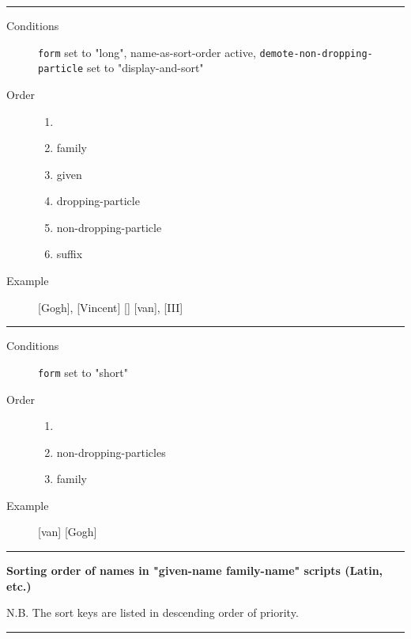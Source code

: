 \begin{center}\rule{0.5\linewidth}{0.5pt}\end{center}

\begin{description}
\item[Conditions]
\texttt{form} set to "long", name-as-sort-order active,
\texttt{demote-non-dropping-particle} set to "display-and-sort"
\item[Order]
\begin{enumerate}
\def\labelenumi{\arabic{enumi})}
\tightlist
\item[]
\item
  family
\item
  given
\item
  dropping-particle
\item
  non-dropping-particle
\item
  suffix
\end{enumerate}
\item[Example]
{[}Gogh{]}, {[}Vincent{]} {[}{]} {[}van{]}, {[}III{]}
\end{description}

\begin{center}\rule{0.5\linewidth}{0.5pt}\end{center}

\begin{description}
\item[Conditions]
\texttt{form} set to "short"
\item[Order]
\begin{enumerate}
\def\labelenumi{\arabic{enumi})}
\tightlist
\item[]
\item
  non-dropping-particles
\item
  family
\end{enumerate}
\item[Example]
{[}van{]} {[}Gogh{]}
\end{description}

\begin{center}\rule{0.5\linewidth}{0.5pt}\end{center}

\textbf{Sorting order of names in "given-name family-name" scripts
(Latin, etc.)}

N.B. The sort keys are listed in descending order of priority.

\begin{center}\rule{0.5\linewidth}{0.5pt}\end{center}

